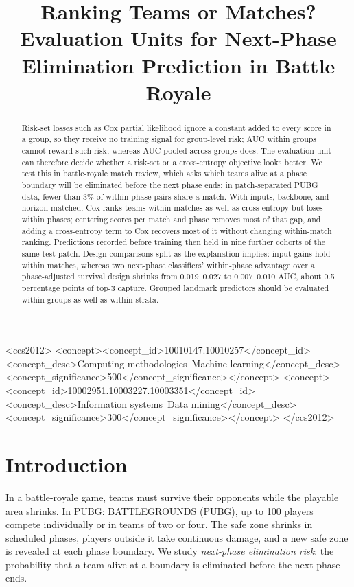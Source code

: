 \documentclass[sigconf,anonymous,nonacm]{acmart}
\begin{document}
\title[Evaluation Units for Next-Phase Elimination Prediction]{Ranking Teams or Matches? Evaluation Units for Next-Phase Elimination Prediction in Battle Royale}
\begin{abstract}
Risk-set losses such as Cox partial likelihood ignore a constant added to every score in a group, so they receive no training signal for group-level risk; AUC within groups cannot reward such risk, whereas AUC pooled across groups does. The evaluation unit can therefore decide whether a risk-set or a cross-entropy objective looks better. We test this in battle-royale match review, which asks which teams alive at a phase boundary will be eliminated before the next phase ends; in patch-separated PUBG data, fewer than 3\% of within-phase pairs share a match. With inputs, backbone, and horizon matched, Cox ranks teams within matches as well as cross-entropy but loses within phases; centering scores per match and phase removes most of that gap, and adding a cross-entropy term to Cox recovers most of it without changing within-match ranking. Predictions recorded before training then held in nine further cohorts of the same test patch. Design comparisons split as the explanation implies: input gains hold within matches, whereas two next-phase classifiers' within-phase advantage over a phase-adjusted survival design shrinks from 0.019--0.027 to 0.007--0.010 AUC, about 0.5 percentage points of top-3 capture. Grouped landmark predictors should be evaluated within groups as well as within strata.
\end{abstract}
\begin{CCSXML}
<ccs2012>
<concept><concept_id>10010147.10010257</concept_id><concept_desc>Computing methodologies~Machine learning</concept_desc><concept_significance>500</concept_significance></concept>
<concept><concept_id>10002951.10003227.10003351</concept_id><concept_desc>Information systems~Data mining</concept_desc><concept_significance>300</concept_significance></concept>
</ccs2012>
\end{CCSXML}
\maketitle
\section{Introduction}
\label{sec:introduction}
In a battle-royale game, teams must survive their opponents while the playable area shrinks. In PUBG: BATTLEGROUNDS (PUBG), up to 100 players compete individually or in teams of two or four. The safe zone shrinks in scheduled phases, players outside it take continuous damage, and a new safe zone is revealed at each phase boundary. We study \emph{next-phase elimination risk}: the probability that a team alive at a boundary is eliminated before the next phase ends.
\end{document}
